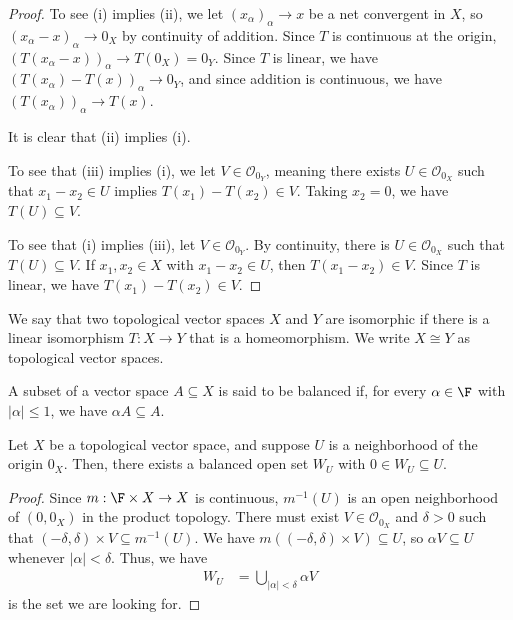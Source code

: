 \documentclass[10pt]{mypackage}
\begin{document}
\begin{proof}
  To see (i) implies (ii), we let $\left(x_{\alpha}\right)_{\alpha}\rightarrow x$ be a net convergent in $X$, so $\left(x_{\alpha} - x\right)_{\alpha}\rightarrow 0_{X}$ by continuity of addition. Since $T$ is continuous at the origin, $\left(T\left(x_{\alpha} - x\right)\right)_{\alpha}\rightarrow T\left(0_{X}\right) = 0_{Y}$. Since $T$ is linear, we have $\left(T\left(x_{\alpha}\right) - T\left(x\right)\right)_{\alpha}\rightarrow 0_{Y}$, and since addition is continuous, we have $\left(T\left(x_{\alpha}\right)\right)_{\alpha}\rightarrow T(x)$.\newline

  It is clear that (ii) implies (i).\newline

  To see that (iii) implies (i), we let $V\in \mathcal{O}_{0_Y}$, meaning there exists $U\in \mathcal{O}_{0_X}$ such that $x_1-x_2\in U$ implies $T\left(x_1\right) - T\left(x_2\right)\in V$. Taking $x_2 = 0$, we have $T(U)\subseteq V$.\newline

  To see that (i) implies (iii), let $V\in \mathcal{O}_{0_Y}$. By continuity, there is $U\in \mathcal{O}_{0_X}$ such that $T\left(U\right)\subseteq V$. If $x_1,x_2\in X$ with $x_1 - x_2\in U$, then $T\left(x_1 - x_2\right)\in V$. Since $T$ is linear, we have $T\left(x_1\right) - T\left(x_2\right)\in V$.
\end{proof}
\begin{definition}
  We say that two topological vector spaces $X$ and $Y$ are isomorphic if there is a linear isomorphism $T: X\rightarrow Y$ that is a homeomorphism. We write $X\cong Y$ as topological vector spaces.
\end{definition}
\begin{definition}
  A subset of a vector space $A\subseteq X$ is said to be balanced if, for every $\alpha\in \F$ with $\left\vert \alpha \right\vert \leq 1$, we have $\alpha A \subseteq A$.
\end{definition}
\begin{lemma}
  Let $X$ be a topological vector space, and suppose $U$ is a neighborhood of the origin $0_X$. Then, there exists a balanced open set $W_{U}$ with $0\in W_{U}\subseteq U$.
\end{lemma}
\begin{proof}
  Since $m: \F\times X\rightarrow X$ is continuous, $m^{-1}\left(U\right)$ is an open neighborhood of $\left(0,0_{X}\right)$ in the product topology. There must exist $V\in \mathcal{O}_{0_X}$ and $\delta > 0$ such that $\left(-\delta,\delta\right)\times V\subseteq m^{-1}\left(U\right)$. We have $m\left(\left(-\delta,\delta\right)\times V\right)\subseteq U$, so $\alpha V\subseteq U$ whenever $\left\vert \alpha \right\vert < \delta$. Thus, we have
  \begin{align*}
    W_{U} &= \bigcup_{\left\vert \alpha \right\vert < \delta} \alpha V
  \end{align*}
  is the set we are looking for.
\end{proof}
\end{document}
